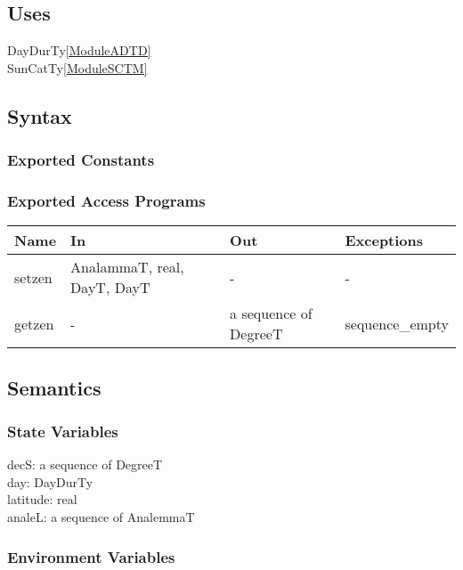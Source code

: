 \documentclass[12pt, titlepage]{article}
\begin{document}
\subsection{Uses}
DayDurTy\ref{ModuleADTD}\\
SunCatTy\ref{ModuleSCTM}

\subsection{Syntax}

\subsubsection{Exported Constants}


\subsubsection{Exported Access Programs}

\begin{center}
\begin{tabular}{p{2cm} p{5cm} p{4cm} p{1cm}}
\hline
\textbf{Name} & \textbf{In} & \textbf{Out} & \textbf{Exceptions} \\
\hline 
setzen & AnalammaT, real, DayT, DayT & -  & -\\
getzen &  -  & a sequence of DegreeT & sequence\_empty \\

\hline
\end{tabular}
\end{center}


\subsection{Semantics}

\subsubsection{State Variables}

decS: a sequence of DegreeT\\
day: DayDurTy\\
latitude: real\\
analeL: a sequence of AnalemmaT


\subsubsection{Environment Variables}
\end{document}
